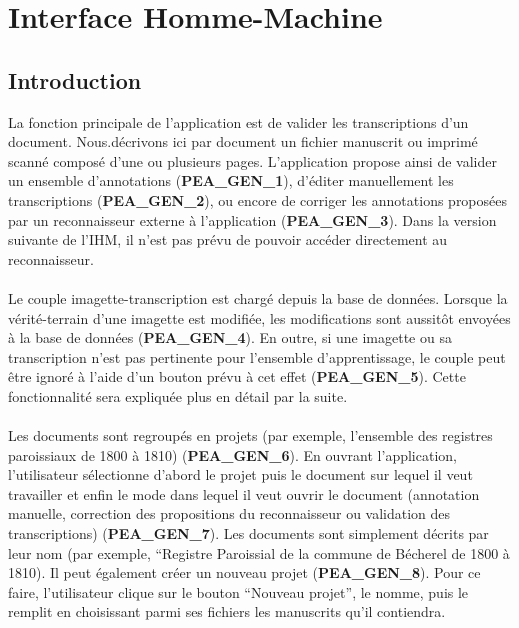 \section{Interface Homme-Machine}

\subsection{Introduction}

La fonction principale de l’application est de valider les transcriptions d’un document.
Nous.décrivons ici par document un fichier manuscrit ou imprimé scanné composé d’une ou plusieurs pages. L’application propose ainsi de valider un ensemble d’annotations
(\textbf{PEA\_GEN\_1}), d’éditer manuellement les transcriptions
(\textbf{PEA\_GEN\_2}), ou encore de corriger les annotations proposées par un
reconnaisseur externe à l’application (\textbf{PEA\_GEN\_3}). Dans la version suivante 
de l'IHM, il n'est pas prévu de pouvoir accéder directement au reconnaisseur.

\paragraph{}
Le couple imagette-transcription est chargé depuis la base de données. Lorsque
la vérité-terrain d’une imagette est modifiée, les modifications sont aussitôt
envoyées à la base de données (\textbf{PEA\_GEN\_4}). En outre, si une
imagette ou sa transcription n’est pas pertinente pour l’ensemble
d’apprentissage, le couple peut être ignoré à l’aide d’un bouton prévu à cet
effet (\textbf{PEA\_GEN\_5}). Cette fonctionnalité sera expliquée plus en
détail par la suite.

\paragraph{}
Les documents sont regroupés en projets (par exemple, l’ensemble des registres
paroissiaux de 1800 à 1810) (\textbf{PEA\_GEN\_6}). En ouvrant l’application,
l’utilisateur sélectionne d’abord le projet puis le document sur lequel il
veut travailler et enfin le mode dans lequel il veut ouvrir le document 
(annotation manuelle, correction des propositions du reconnaisseur ou validation 
des transcriptions) (\textbf{PEA\_GEN\_7}). Les documents sont simplement décrits 
par leur nom (par exemple, “Registre Paroissial de la commune de Bécherel de 
1800 à 1810).  Il peut également créer un nouveau
projet (\textbf{PEA\_GEN\_8}). Pour ce faire, l’utilisateur clique sur le 
bouton “Nouveau projet”, le nomme, puis le remplit en choisissant parmi 
ses fichiers les manuscrits qu’il contiendra.

